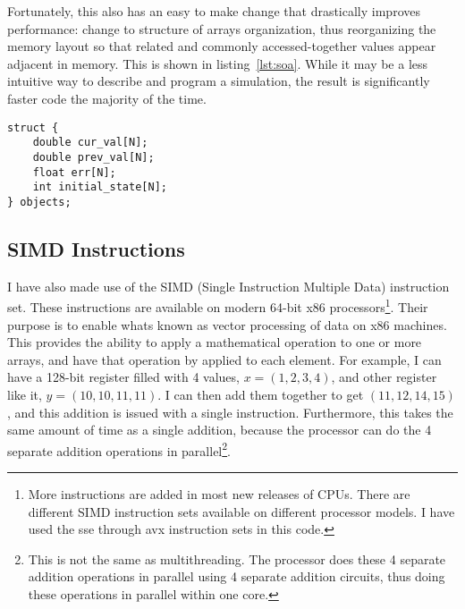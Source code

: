 Fortunately, this also has an easy to make change that drastically improves performance: change to structure of
arrays organization, thus reorganizing the memory layout so that related and commonly accessed-together values
appear adjacent in memory\cite{intel-opt}. This is shown in listing~\ref{lst:soa}. While it may be a less intuitive way to describe
and program a simulation, the result is significantly faster code the majority of the time.

\begin{minipage}{\linewidth}
\begin{lstlisting}[frame=single,label=lst:soa,caption={Structure of arrays organization.}]
struct {
	double cur_val[N];
	double prev_val[N];
	float err[N];
	int initial_state[N];
} objects;
\end{lstlisting}
\end{minipage}
















\subsection{SIMD Instructions}
I have also made use of the SIMD (Single Instruction Multiple Data) instruction set. These instructions are available
on modern 64-bit x86 processors\cite{intel-3a}\footnote{More instructions are added in most new releases of CPUs. There are different
SIMD instruction sets available on different processor models. I have used the sse through avx instruction sets in this
code.}. Their purpose is to enable whats known as vector processing of data on x86 machines. This provides the ability
to apply a mathematical operation to one or more arrays, and have that operation by applied to each element. For example,
I can have a 128-bit register filled with 4 values, $x=(1,2,3,4)$, and other register like it, $y=(10, 10, 11, 11)$. I can
then add them together to get $(11, 12, 14, 15)$, and this addition is issued with a single instruction. Furthermore, this
takes the same amount of time as a single addition, because the processor can do the 4 separate addition operations in
parallel\footnote{This is not the same as multithreading. The processor does these 4 separate addition operations in parallel
using 4 separate addition circuits, thus doing these operations in parallel within one core.}.

